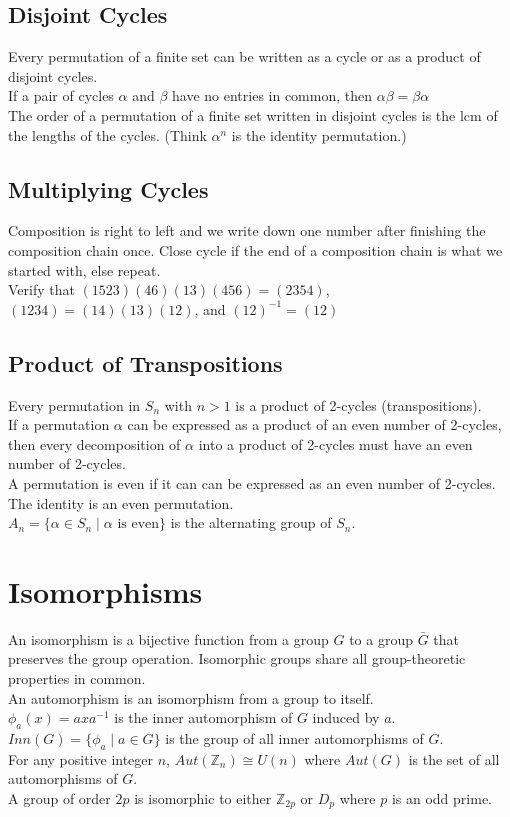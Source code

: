 \documentclass{article}
\begin{document}
\subsection{Disjoint Cycles}
Every permutation of a finite set can be written as a cycle or as a product of disjoint cycles. \\
If a pair of cycles $\alpha$ and $\beta$ have no entries in common, then $\alpha \beta = \beta \alpha$ \\
The order of a permutation of a finite set written in disjoint cycles is the lcm of the lengths of the cycles. (Think $\alpha ^n$ is the identity permutation.)
\subsection{Multiplying Cycles}
Composition is right to left and we write down one number after finishing the composition chain once. Close cycle if the end of a composition chain is what we started with, else repeat. \\
Verify that $(1523)(46)(13)(456) = (2354)$, $(1234) = (14)(13)(12)$, and $(12)^{-1} = (12)$ 
\subsection{Product of Transpositions}
Every permutation in $S_n$ with $n > 1$ is a product of 2-cycles (transpositions). \\
If a permutation $\alpha$ can be expressed as a product of an even number of 2-cycles, then every decomposition of $\alpha$ into a product of 2-cycles must have an even number of 2-cycles. \\
A permutation is even if it can can be expressed as an even number of 2-cycles. \\
The identity is an even permutation. \\
$A_n = \{\alpha \in S_n \mid \alpha \text{ is even} \}$ is the alternating group of $S_n$. 


\section{Isomorphisms}
An isomorphism is a bijective function from a group $G$ to a group $\bar{G}$ that preserves the group operation. Isomorphic groups share all group-theoretic properties in common. \\
An automorphism is an isomorphism from a group to itself. \\
$\phi_a(x) = axa^{-1}$ is the inner automorphism of $G$ induced by $a$.\\
$Inn(G) = \{\phi_a \mid a \in G\}$ is the group of all inner automorphisms of $G$. \\
For any positive integer $n$, $Aut(\mathbb{Z}_n) \cong U(n)$ where $Aut(G)$ is the set of all automorphisms of $G$. \\
A group of order $2p$ is isomorphic to either $\mathbb{Z}_{2p}$ or $D_p$ where $p$ is an odd prime.
\end{document}
